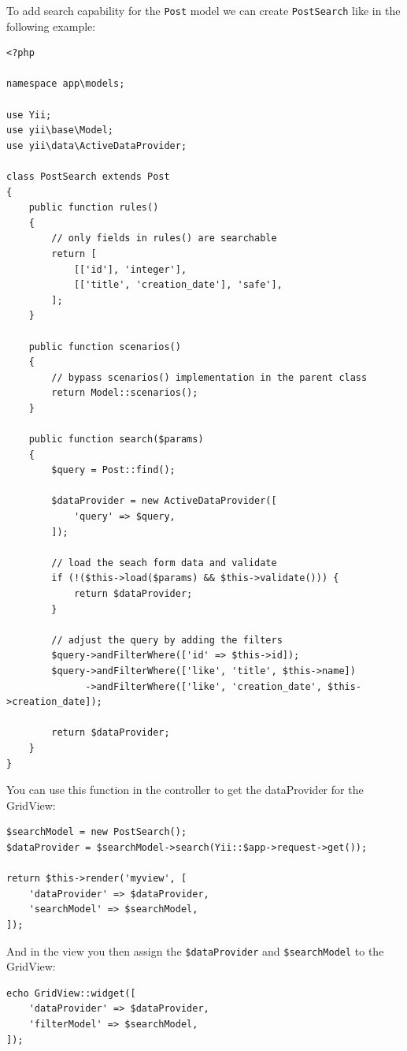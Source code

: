 To add search capability for the \lstinline|Post| model we can create \lstinline|PostSearch| like in the following example:

\lstset{language=php}\begin{lstlisting}
<?php

namespace app\models;

use Yii;
use yii\base\Model;
use yii\data\ActiveDataProvider;

class PostSearch extends Post
{
    public function rules()
    {
        // only fields in rules() are searchable
        return [
            [['id'], 'integer'],
            [['title', 'creation_date'], 'safe'],
        ];
    }

    public function scenarios()
    {
        // bypass scenarios() implementation in the parent class
        return Model::scenarios();
    }

    public function search($params)
    {
        $query = Post::find();

        $dataProvider = new ActiveDataProvider([
            'query' => $query,
        ]);

        // load the seach form data and validate
        if (!($this->load($params) && $this->validate())) {
            return $dataProvider;
        }

        // adjust the query by adding the filters
        $query->andFilterWhere(['id' => $this->id]);
        $query->andFilterWhere(['like', 'title', $this->name])
              ->andFilterWhere(['like', 'creation_date', $this->creation_date]);

        return $dataProvider;
    }
}

\end{lstlisting}
You can use this function in the controller to get the dataProvider for the GridView:

\lstset{language=php}\begin{lstlisting}
$searchModel = new PostSearch();
$dataProvider = $searchModel->search(Yii::$app->request->get());

return $this->render('myview', [
    'dataProvider' => $dataProvider,
    'searchModel' => $searchModel,
]);
\end{lstlisting}
And in the view you then assign the \lstinline|$dataProvider| and \lstinline|$searchModel| to the GridView:

\lstset{language=php}\begin{lstlisting}
echo GridView::widget([
    'dataProvider' => $dataProvider,
    'filterModel' => $searchModel,
]);
\end{lstlisting}
